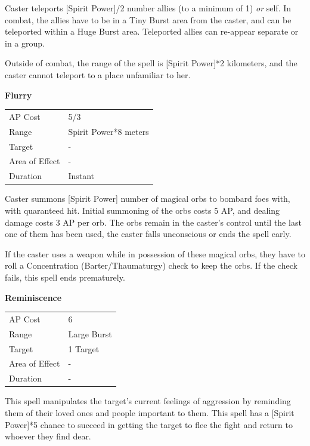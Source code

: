 \documentclass[11pt,a4paper,twocolumn]{book}
\begin{document}
Caster teleports [Spirit Power]/2 number allies (to a minimum of 1) \textit{or} self. In combat, the allies have to be in a Tiny Burst area from the caster, and can be teleported within a Huge Burst area. Teleported allies can re-appear separate or in a group.

Outside of combat, the range of the spell is [Spirit Power]*2 kilometers, and the caster cannot teleport to a place unfamiliar to her.

\bigskip
\noindent
\textbf{Flurry}

\smallskip
{
	\begin{tabu} to 70mm{| X[l,4] | X[l,7] |}
		\hline
        AP Cost	      	& 5/3							\\
        Range     		& Spirit Power*8 meters		\\
        Target      	& -							\\
        Area of Effect  & -  	 					\\
        Duration     	& Instant					\\ \hline
	\end{tabu}
		
}
\smallskip

Caster summons [Spirit Power] number of magical orbs to bombard foes with, with quaranteed hit. Initial summoning of the orbs costs 5 AP, and dealing damage costs 3 AP per orb. The orbs remain in the caster's control until the last one of them has been used, the caster falls unconscious or ends the spell early. 

If the caster uses a weapon while in possession of these magical orbs, they have to roll a Concentration (Barter/Thaumaturgy) check to keep the orbs. If the check fails, this spell ends prematurely.

\bigskip
\noindent
\textbf{Reminiscence}

\smallskip
{
	\begin{tabu} to 70mm{| X[l,4] | X[l,7] |}
		\hline
        AP Cost	      	& 6 					\\
        Range     		& Large Burst	\\
        Target      	& 1 Target		\\
        Area of Effect  & -  	 \\
        Duration     	& -				\\ \hline
	\end{tabu}
		
}
\smallskip

This spell manipulates the target's current feelings of aggression by reminding them of their loved ones and people important to them. This spell has a [Spirit Power]*5 chance to succeed in getting the target to flee the fight and return to whoever they find dear. 
\end{document}
